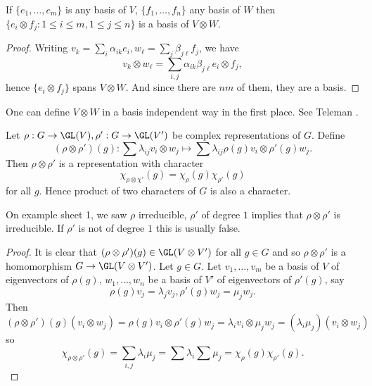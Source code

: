 \documentclass[a4paper]{article}
\theoremstyle{definition}
\begin{document}
\begin{lemma}
  If \(\{e_1, \dots, e_m\}\) is any basis of \(V\), \(\{f_1, \dots, f_n\}\) any basis of \(W\) then \(\{e_i \otimes f_j: 1 \leq i \leq m, 1 \leq j \leq n\}\) is a basis of \(V \otimes W\).
\end{lemma}

\begin{proof}
  Writing \(v_k = \sum_i \alpha_{ik} e_i, w_\ell = \sum_j \beta_{j\ell} f_j\), we have
  \[
    v_k \otimes w_\ell = \sum_{i, j} \alpha_{ik} \beta_{j\ell} e_i \otimes f_j,
  \]
  hence \(\{e_i \otimes f_j\}\) spans \(V \otimes W\). And since there are \(nm\) of them, they are a basis.
\end{proof}

\begin{remark}
  One can define \(V \otimes W\) in a basis independent way in the first place. See Teleman .
\end{remark}

\begin{proposition}
  Let \(\rho: G \to \GL(V), \rho': G \to \GL(V')\) be complex representations of \(G\). Define
  \[
    (\rho \otimes \rho') (g): \sum \lambda_{ij} v_i \otimes w_j \mapsto \sum \lambda_{ij} \rho(g) v_i \otimes \rho'(g) w_j.
  \]
  Then \(\rho \otimes \rho'\) is a representation with character
  \[
    \chi_{\rho \otimes \chi'} (g) = \chi_\rho(g) \chi_{\rho'} (g)
  \]
  for all \(g\). Hence product of two characters of \(G\) is also a character.
\end{proposition}

\begin{remark}
  On example sheet 1, we saw \(\rho\) irreducible, \(\rho'\) of degree \(1\) implies that \(\rho \otimes \rho'\) is irreducible. If \(\rho'\) is not of degree \(1\) this is usually false.
\end{remark}

\begin{proof}
  It is clear that \((\rho \otimes \rho') (g) \in \GL(V \otimes V')\) for all \(g \in G\) and so \(\rho \otimes \rho'\) is a homomorphism \(G \to \GL(V \otimes V')\). Let \(g \in G\). Let \(v_1, \dots, v_m\) be a basis of \(V\) of eigenvectors of \(\rho(g)\), \(w_1, \dots, w_n\) be a basis of \(V'\) of eigenvectors of \(\rho'(g)\), say
  \[
    \rho(g) v_j = \lambda_j v_j, \rho'(g) w_j = \mu_j w_j.
  \]
  Then
  \[
    (\rho \otimes \rho')(g) (v_i \otimes w_j)
    = \rho(g) v_i \otimes \rho'(g) w_j
    = \lambda_i v_i \otimes \mu_j w_j
    = (\lambda_i \mu_j) (v_i \otimes w_j)
  \]
  so
  \[
    \chi_{\rho \otimes \rho'} (g)
    = \sum_{i, j} \lambda_i \mu_j
    = \sum \lambda_i \sum \mu_j
    = \chi_\rho(g) \chi_{\rho'}(g).
  \]
\end{proof}
\end{document}

